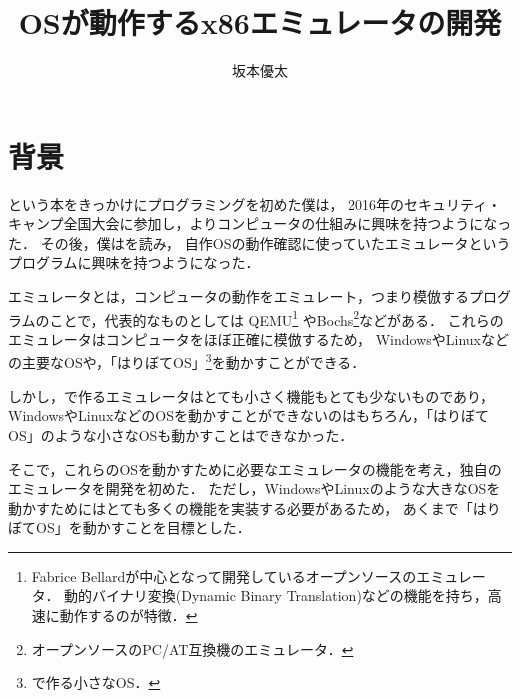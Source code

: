 \documentclass[10pt,a4j]{jsarticle}
\title{\vspace{-2cm}OSが動作するx86エミュレータの開発}
\author{坂本優太}
\date{}
\begin{document}
\maketitle


\section{背景}
\cite[30日でできる！ OS自作入門]{30days-osdev}という本をきっかけにプログラミングを初めた僕は，
2016年のセキュリティ・キャンプ全国大会に参加し，よりコンピュータの仕組みに興味を持つようになった．
その後，僕は\cite[自作エミュレータで学ぶx86アーキテクチャ]{learn-x86-by-emu}を読み，
自作OSの動作確認に使っていたエミュレータというプログラムに興味を持つようになった．

エミュレータとは，コンピュータの動作をエミュレート，つまり模倣するプログラムのことで，代表的なものとしては
QEMU\footnote{Fabrice Bellardが中心となって開発しているオープンソースのエミュレータ．
動的バイナリ変換(Dynamic Binary Translation)などの機能を持ち，高速に動作するのが特徴．}
やBochs\footnote{オープンソースのPC/AT互換機のエミュレータ．}などがある．
これらのエミュレータはコンピュータをほぼ正確に模倣するため，
WindowsやLinuxなどの主要なOSや，「はりぼてOS」\footnote{\cite{30days-osdev}で作る小さなOS．}を動かすことができる．

しかし，\cite{learn-x86-by-emu}で作るエミュレータはとても小さく機能もとても少ないものであり，
WindowsやLinuxなどのOSを動かすことができないのはもちろん，「はりぼてOS」のような小さなOSも動かすことはできなかった．

そこで，これらのOSを動かすために必要なエミュレータの機能を考え，独自のエミュレータを開発を初めた．
ただし，WindowsやLinuxのような大きなOSを動かすためにはとても多くの機能を実装する必要があるため，
あくまで「はりぼてOS」を動かすことを目標とした．
\end{document}

